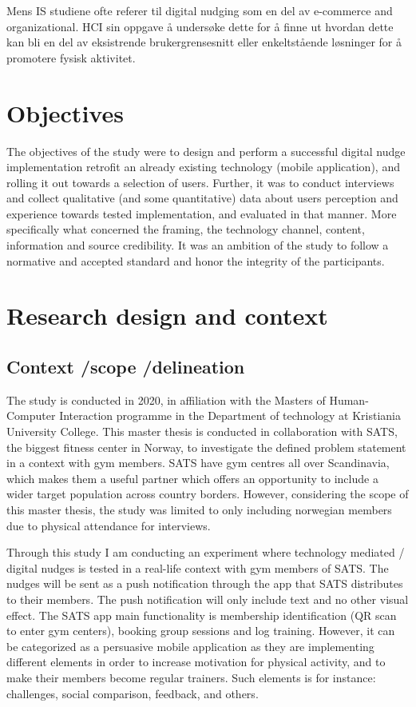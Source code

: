 Mens IS studiene ofte referer til digital nudging som en del av e-commerce and organizational. HCI sin oppgave å undersøke dette for å finne ut hvordan dette kan bli en del av eksistrende brukergrensesnitt eller enkeltstående løsninger for å promotere fysisk aktivitet.

\section{Objectives}
The objectives of the study were to design and perform a successful digital nudge implementation retrofit an already existing technology (mobile application), and rolling it out towards a selection of users.
Further, it was to conduct interviews and collect qualitative (and some quantitative) data about users perception and experience towards tested implementation, and evaluated in that manner. More specifically what concerned the framing, the technology channel, content, information and source credibility. It was an ambition of the study to follow a normative and accepted standard and honor the integrity of the participants. 

\section{Research design and context}
\subsection{Context /scope /delineation }

The study is conducted in 2020, in affiliation with the Masters of Human-Computer Interaction programme in the Department of technology at Kristiania University College. This master thesis is conducted in collaboration with SATS, the biggest fitness center in Norway, to investigate the defined problem statement in a context with gym members. SATS have gym centres all over Scandinavia, which makes them a useful partner which offers an opportunity to include a wider target population across country borders. However, considering the scope of this master thesis, the study was limited to only including norwegian members due to physical attendance for interviews. 

Through this study I am conducting an experiment where technology mediated / digital nudges is tested in a real-life context with gym members of SATS. The nudges will be sent as a push notification through the app that SATS distributes to their members. The push notification will only include text and no other visual effect. The SATS app main functionality is membership identification (QR scan to enter gym centers), booking group sessions and log training. However, it can be categorized as a persuasive mobile application as they are implementing different elements in order to increase motivation for physical activity, and to make their members become regular trainers. Such elements is for instance: challenges, social comparison, feedback, and others. 

